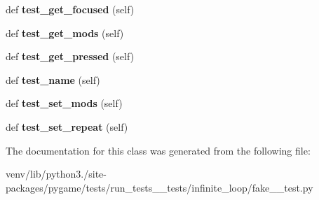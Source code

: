 \begin{DoxyCompactItemize}
\item 
\mbox{\label{classpygame_1_1tests_1_1run__tests____tests_1_1infinite__loop_1_1fake__2__test_1_1_key_module_test_a9a4f6246f16e2a21a82cbebeac563784}} 
def {\bfseries test\+\_\+get\+\_\+focused} (self)
\item 
\mbox{\label{classpygame_1_1tests_1_1run__tests____tests_1_1infinite__loop_1_1fake__2__test_1_1_key_module_test_a1b735ea8eb6f74919f6e5ac5944d5f92}} 
def {\bfseries test\+\_\+get\+\_\+mods} (self)
\item 
\mbox{\label{classpygame_1_1tests_1_1run__tests____tests_1_1infinite__loop_1_1fake__2__test_1_1_key_module_test_a3e7a7a3d3bda0d561f2b537daa616794}} 
def {\bfseries test\+\_\+get\+\_\+pressed} (self)
\item 
\mbox{\label{classpygame_1_1tests_1_1run__tests____tests_1_1infinite__loop_1_1fake__2__test_1_1_key_module_test_a83024734d9cf264ceaf5280f3c6e78d9}} 
def {\bfseries test\+\_\+name} (self)
\item 
\mbox{\label{classpygame_1_1tests_1_1run__tests____tests_1_1infinite__loop_1_1fake__2__test_1_1_key_module_test_a7aebec2317756da230c8965c138ef182}} 
def {\bfseries test\+\_\+set\+\_\+mods} (self)
\item 
\mbox{\label{classpygame_1_1tests_1_1run__tests____tests_1_1infinite__loop_1_1fake__2__test_1_1_key_module_test_a1c96e60f132e840827a50148e357ab0e}} 
def {\bfseries test\+\_\+set\+\_\+repeat} (self)
\end{DoxyCompactItemize}


The documentation for this class was generated from the following file\+:\begin{DoxyCompactItemize}
\item 
venv/lib/python3./site-\/packages/pygame/tests/run\+\_\+tests\+\_\+\+\_\+tests/infinite\+\_\+loop/fake\+\_\+\_\+test.\+py\end{DoxyCompactItemize}
